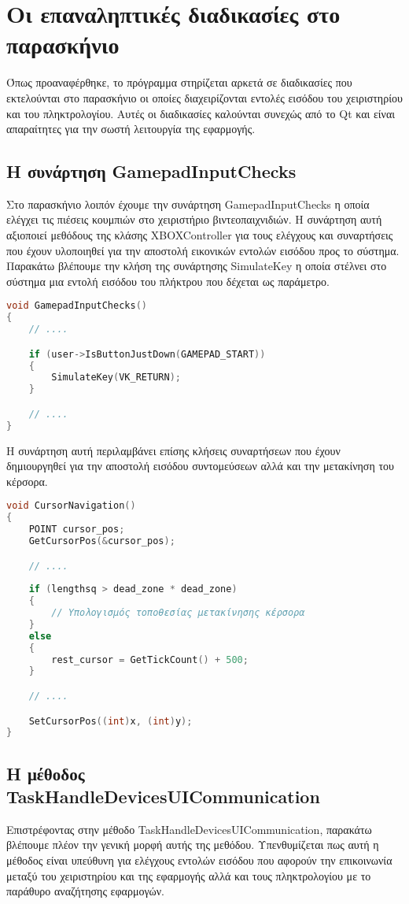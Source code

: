\section{Οι επαναληπτικές διαδικασίες στο παρασκήνιο}

Όπως προαναφέρθηκε, το πρόγραμμα στηρίζεται αρκετά σε διαδικασίες που εκτελούνται στο παρασκήνιο
οι οποίες διαχειρίζονται εντολές εισόδου του χειριστηρίου και του πληκτρολογίου. Αυτές οι διαδικασίες
καλούνται συνεχώς από το Qt και είναι απαραίτητες για την σωστή λειτουργία της εφαρμογής. 

\subsection{Η συνάρτηση GamepadInputChecks}
Στο παρασκήνιο λοιπόν έχουμε την συνάρτηση GamepadInputChecks η οποία ελέγχει τις πιέσεις κουμπιών στο χειριστήριο 
βιντεοπαιχνιδιών. Η συνάρτηση αυτή αξιοποιεί μεθόδους της κλάσης XBOXController για τους ελέγχους και
συναρτήσεις που έχουν υλοποιηθεί για την αποστολή εικονικών εντολών εισόδου προς το σύστημα. Παρακάτω
βλέπουμε την κλήση της συνάρτησης SimulateKey η οποία στέλνει στο σύστημα μια εντολή εισόδου του πλήκτρου
που δέχεται ως παράμετρο.

\begin{lstlisting}[language=C++, style=cppstyle]
void GamepadInputChecks()
{
    // ....

    if (user->IsButtonJustDown(GAMEPAD_START))
    {
        SimulateKey(VK_RETURN);
    }

    // ....
}
\end{lstlisting}

Η συνάρτηση αυτή περιλαμβάνει επίσης κλήσεις συναρτήσεων που έχουν δημιουργηθεί για την αποστολή εισόδου
συντομεύσεων αλλά και την μετακίνηση του κέρσορα.


\begin{lstlisting}[language=C++, style=cppstyle]
void CursorNavigation()
{
    POINT cursor_pos;
    GetCursorPos(&cursor_pos);

    // ....
    
    if (lengthsq > dead_zone * dead_zone)
    {
        // Υπολογισμός τοποθεσίας μετακίνησης κέρσορα
    }
    else
    {
        rest_cursor = GetTickCount() + 500;
    }

    // ....

    SetCursorPos((int)x, (int)y);
}
\end{lstlisting}

\subsection{Η μέθοδος TaskHandleDevicesUICommunication}
Επιστρέφοντας στην μέθοδο TaskHandleDevicesUICommunication, παρακάτω βλέπουμε πλέον την γενική μορφή αυτής της μεθόδου.
Υπενθυμίζεται πως αυτή η μέθοδος είναι υπεύθυνη για ελέγχους εντολών εισόδου που αφορούν την επικοινωνία μεταξύ
του χειριστηρίου και της εφαρμογής αλλά και τους πληκτρολογίου με το παράθυρο αναζήτησης εφαρμογών.




